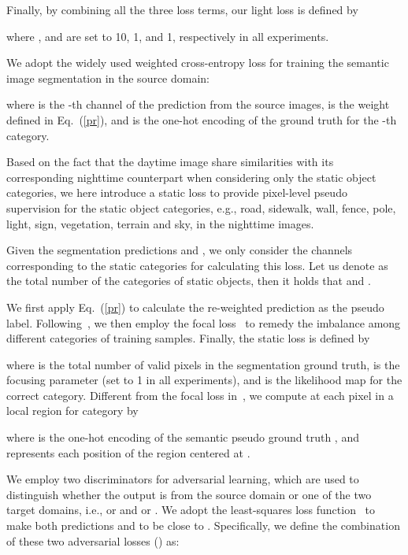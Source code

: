 \documentclass[final]{cvpr}
\begin{document}
Finally, by combining all the three loss terms, our light loss  is defined by

where , and  are set to 10, 1, and 1, respectively in all experiments.

\vspace{0.1cm}
\hspace{0.2cm}
We adopt the widely used weighted cross-entropy loss for training the semantic image segmentation in the source domain:

where  is the -th channel of the prediction  from the source images,  is the weight defined in Eq.~(\ref{pr}), and  is the one-hot encoding of the ground truth for the -th category.

\vspace{0.1cm}
\hspace{0.2cm}
Based on the fact that the daytime image share similarities with its corresponding nighttime counterpart when considering only the static object categories, 
we here introduce a static loss to provide  pixel-level pseudo supervision for the static object categories, e.g., road, sidewalk, wall, fence, pole, light, sign, vegetation, terrain and sky, in the nighttime images. 

Given the segmentation predictions  and , we only consider the channels corresponding to the static categories 
for calculating this loss. 
Let us denote  as the total number of the categories of static objects, then it holds that
  and .

We first apply Eq.~(\ref{pr}) to calculate the re-weighted prediction  as the pseudo label. 
Following~\cite{yu2018learning,chen2019domain}, we then  employ the focal loss~\cite{lin2017focal} to remedy the imbalance among different categories of training samples. 
Finally, the static loss  is defined by

where  is the total number of valid pixels in the segmentation ground truth,   is the focusing parameter (set to 1 in all experiments), and  is the likelihood map for the correct category.
Different from the focal loss in~\cite{lin2017focal}, we compute  at each pixel  in a  local region for category  by

where  is the one-hot encoding of the semantic pseudo ground truth , and  represents each position of the  region centered at .

\vspace{0.1cm}
\hspace{0.2cm}
We employ two discriminators for adversarial learning, which are used to distinguish whether the output is from the source domain or one of the two target domains, i.e.,  or  and  or . 
We adopt the least-squares loss function~\cite{mao2017least} to make both predictions  and  to be close to . 
Specifically, we define the combination of these two adversarial losses () as:
\end{document}
